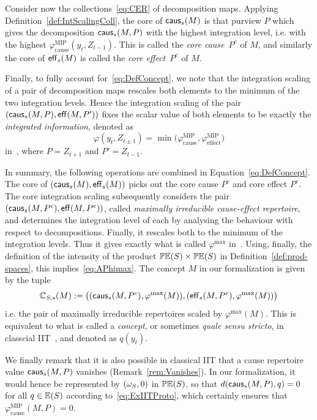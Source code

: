 Consider now the collections~\eqref{eq:CER} of decomposition maps. Applying Definition~\ref{def:IntScalingColl}, the core of $\mathsf{caus}_s(M)$ is that purview $P$ which gives the decomposition $\mathsf{caus}_s(M,P)$ with the highest integration level, i.e. with the highest $\varphi_{\textrm{cause}}^{\textrm{MIP}}( y_t, Z_{t-1})$. This is called the \emph{core cause}~$P^c$ of $M$, and similarly the core of $\mathsf{eff}_s(M)$ is called the \emph{core effect}~$P^e$ of $M$.

Finally, to fully account for~\eqref{eq:DefConcept}, we note that the integration scaling of a pair of decomposition maps rescales both elements to the minimum of the two integration levels. Hence the integration scaling of the pair $(\mathsf{caus}_s(M,P),\mathsf{eff}(M,P'))$ fixes the scalar value of both elements to be exactly the \emph{integrated information}, denoted as
\[
\varphi(y_t,Z_{t\pm1}) = \min \big(\varphi_{\textrm{cause}}^{\textrm{MIP}},\varphi_{\textrm{effect}}^{\textrm{MIP}} \big)
\]
in~\cite{tononi.2015.scholarpedia}, where $P = Z_{t+1}$ and $P'=Z_{t-1}$.

In summary, the following operations are combined in Equation~\eqref{eq:DefConcept}. The core of $ \left(\mathsf{caus}_s(M), \mathsf{eff}_s(M) \right)$ picks out the core cause $P^c$ and core effect $P^e$. The core integration scaling subsequently considers the pair $(\mathsf{caus}_s(M,P^c),\mathsf{eff}(M,P^e))$, called \emph{maximally irreducible cause-effect repertoire}, and determines the integration level of each by analysing the behaviour with respect to decompositions. Finally, it rescales both to the minimum of the integration levels. Thus it gives exactly what is called $\varphi^{\textrm{max}}$ in~\cite{tononi.2015.scholarpedia}. Using, finally, the definition of the intensity of the product $\mathbb{PE}(S) \times \mathbb{PE}(S)$ in Definition~\ref{def:prod-spaces}, this implies~\eqref{eq:APhimax}.
The concept $M$ in our formalization is given by the tuple 
\[
\mathbb{C}_{S,s}(M)
:=
\big((\mathsf{caus}_s(M,P^c), \varphi^{\textrm{max}}(M)), (\mathsf{eff}_s(M,P^e),  \varphi^{\textrm{max}}(M))\big)
\]
i.e. the pair of maximally irreducible repertoires scaled by $\varphi^{\textrm{max}}(M)$. This is equivalent to
what is called a \emph{concept}, or sometimes \emph{quale sensu stricto}, in classcial IIT~\cite{tononi.2015.scholarpedia}, and denoted as $q(y_t)$.

We finally remark that it is also possible in classical IIT that a cause repertoire value $\mathsf{caus}_s(M,P)$ vanishes (Remark~\ref{rem:Vanishes}). In our formalization, it would hence be represented by $({\omega_{S}},0)$ in $\mathbb{PE}(S)$, so that $d(\mathsf{caus}_s(M,P),q) = 0$ for all $q \in \mathbb{E}(S)$ according to~\eqref{eq:ExIITProto}, which certainly ensures that $\varphi_{\textrm{cause}}^{\textrm{MIP}}(M,P) = 0$. 




